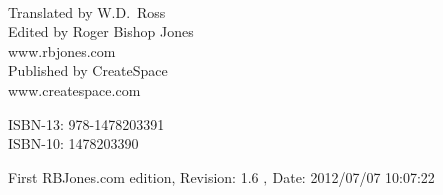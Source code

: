 \begin{titlepage}
\maketitle

\ 
\\

\vfil

\begin{centering}

\vfil


\vfill

Translated by W.D.~Ross\\
\vspace{0.2in}
Edited by Roger Bishop Jones\\
\vspace{0.1in}
www.rbjones.com\\
\vspace{0.2in}
Published by CreateSpace\\
\vspace{0.1in}
www.createspace.com\\
\vspace{0.2in}

ISBN-13: 978-1478203391\\
\vspace{0.1in}
ISBN-10: 1478203390

\vspace{0.2in}

{\footnotesize

First RBJones.com edition, $ $Revision: 1.6 $,~$Date: 2012/07/07 10:07:22 $ $

}%

\end{centering}

\thispagestyle{empty}
\end{titlepage}


{\parskip=0pt\tableofcontents}
\vfill

\mainmatter



\backmatter
%
%



\printindex

\vfil



